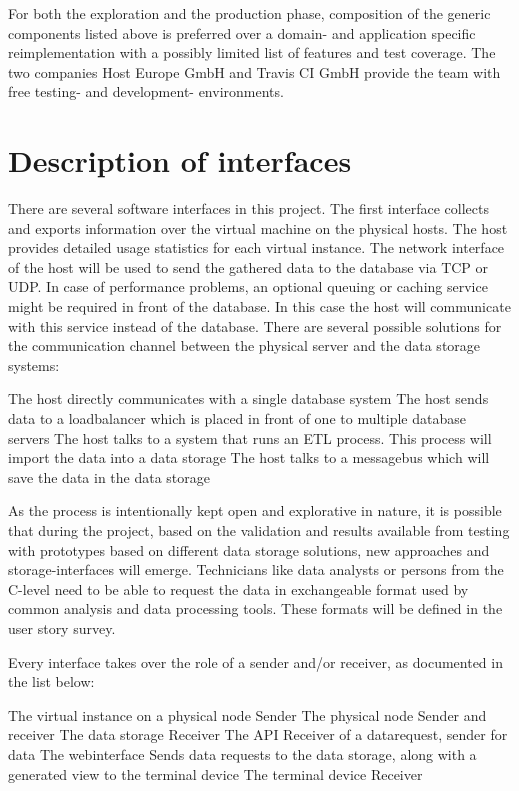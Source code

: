 For both the exploration and the production phase, composition of the generic
components listed above is preferred over a domain- and application specific
reimplementation with a possibly limited list of features and test coverage. The
two companies Host Europe GmbH and Travis CI GmbH provide the team with free
testing- and development- environments.

\section{Description of interfaces}

There are several software interfaces in this project. The first interface
collects and exports information over the virtual machine on the physical hosts.
The host provides detailed usage statistics for each virtual instance. The
network interface of the host will be used to send the gathered data to the
database via TCP or UDP. In case of performance problems, an optional queuing or
caching service might be required in front of the database. In this case the
host will communicate with this service instead of the database. There are
several possible solutions for the communication channel between the physical
server and the data storage systems:

\begin{outline}
    \1 The host directly communicates with a single database system
    \1 The host sends data to a loadbalancer which is placed in front of one to multiple database servers
    \1 The host talks to a system that runs an ETL process. This process will import the data into a data storage
    \1 The host talks to a messagebus which will save the data in the data storage
\end{outline}
As the process is intentionally kept open and explorative in nature, it is
possible that during the project, based on the validation and results available
from testing with prototypes based on different data storage solutions, new
approaches and storage-interfaces will emerge. Technicians like data analysts or
persons from the C-level need to be able to request the data in exchangeable
format used by common analysis and data processing tools. These formats will be
defined in the user story survey.

Every interface takes over the role of a sender and/or receiver, as
documented in the list below:
\begin{outline}
    \1 The virtual instance on a physical node
        \2 Sender
    \1 The physical node
        \2 Sender and receiver
    \1 The data storage
        \2 Receiver
    \1 The API
        \2 Receiver of a datarequest, sender for data
    \1 The webinterface
        \2 Sends data requests to the data storage,  along with a generated view to the terminal device
    \1 The terminal device
        \2 Receiver
\end{outline}

